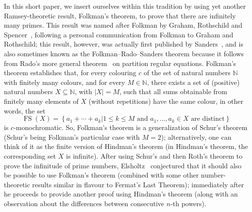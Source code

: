 \documentclass[10pt]{amsart}
\DeclareMathOperator{\fs}{FS}
\theoremstyle{definition}
\begin{document}
In this short paper, we insert ourselves within this tradition by using yet another Ramsey-theoretic result, Folkman's theorem, to prove that there are infinitely many primes. This result was named after Folkman by Graham, Rothschild and Spencer~\cite[\S 3.4]{graham-rothschild-spencer}, following a personal communication from Folkman to Graham and Rothschild; this result, however, was actually first published by Sanders~\cite{sanders}, and is also sometimes known as the Folkman--Rado--Sanders theorem because it follows from Rado's more general theorem~\cite[\S 3.3]{graham-rothschild-spencer} on partition regular equations. Folkman's theorem establishes that, for every colouring $c$ of the set of natural numbers $\mathbb N$ with finitely many colours, and for every $M\in\mathbb N$, there exists a set of (positive) natural numbers $X\subseteq\mathbb N$, with $|X|=M$, such that all sums obtainable from finitely many elements of $X$ (without repetitions) have the same colour, in other words, the set
\begin{equation*}
\fs(X)=\left\{a_1+\cdots+a_k\bigg|1\leq k\leq M\text{ and }a_1,\ldots,a_k\in X\text{ are distinct}\right\}
\end{equation*}
is $c$-monochromatic. So, Folkman's theorem is a generalization of Schur's theorem (Schur's being Folkman's particular case with $M=2$); alternatively, one can think of it as the finite version of Hindman's theorem (in Hindman's theorem, the corresponding set $X$ is infinite). After using Schur's and then Roth's theorem to prove the infinitude of prime numbers, Elsholtz~\cite[p. 254]{elsholtz} conjectured that it should also be possible to use Folkman's theorem (combined with some other number-theoretic results similar in flavour to Fermat's Last Theorem); immediately after he proceeds to provide another proof using Hindman's theorem (along with an observation about the differences between consecutive $n$-th powers).
\end{document}
